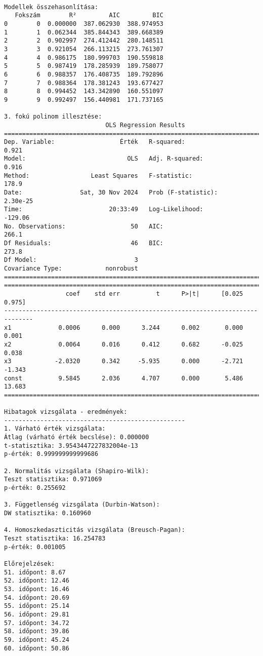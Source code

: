 \documentclass[11pt]{article}
\begin{document}
    \begin{Verbatim}[commandchars=\\\{\}]

Modellek összehasonlítása:
   Fokszám        R²         AIC         BIC
0        0  0.000000  387.062930  388.974953
1        1  0.062344  385.844343  389.668389
2        2  0.902997  274.412442  280.148511
3        3  0.921054  266.113215  273.761307
4        4  0.986175  180.999703  190.559818
5        5  0.987419  178.285939  189.758077
6        6  0.988357  176.408735  189.792896
7        7  0.988364  178.381243  193.677427
8        8  0.994452  143.342890  160.551097
9        9  0.992497  156.440981  171.737165

3. fokú polinom illesztése:
                            OLS Regression Results
==============================================================================
Dep. Variable:                  Érték   R-squared:                       0.921
Model:                            OLS   Adj. R-squared:                  0.916
Method:                 Least Squares   F-statistic:                     178.9
Date:                Sat, 30 Nov 2024   Prob (F-statistic):           2.30e-25
Time:                        20:33:49   Log-Likelihood:                -129.06
No. Observations:                  50   AIC:                             266.1
Df Residuals:                      46   BIC:                             273.8
Df Model:                           3
Covariance Type:            nonrobust
==============================================================================
==============================================================================
                 coef    std err          t      P>|t|      [0.025      0.975]
------------------------------------------------------------------------------
x1             0.0006      0.000      3.244      0.002       0.000       0.001
x2             0.0064      0.016      0.412      0.682      -0.025       0.038
x3            -2.0320      0.342     -5.935      0.000      -2.721      -1.343
const          9.5845      2.036      4.707      0.000       5.486      13.683
==============================================================================

Hibatagok vizsgálata - eredmények:
--------------------------------------------------
1. Várható érték vizsgálata:
Átlag (várható érték becslése): 0.000000
t-statisztika: 3.9543447227832004e-13
p-érték: 0.999999999999686

2. Normalitás vizsgálata (Shapiro-Wilk):
Teszt statisztika: 0.971069
p-érték: 0.255692

3. Függetlenség vizsgálata (Durbin-Watson):
DW statisztika: 0.160960

4. Homoszkedaszticitás vizsgálata (Breusch-Pagan):
Teszt statisztika: 16.254783
p-érték: 0.001005

Előrejelzések:
51. időpont: 8.67
52. időpont: 12.46
53. időpont: 16.46
54. időpont: 20.69
55. időpont: 25.14
56. időpont: 29.81
57. időpont: 34.72
58. időpont: 39.86
59. időpont: 45.24
60. időpont: 50.86
    \end{Verbatim}
\end{document}
